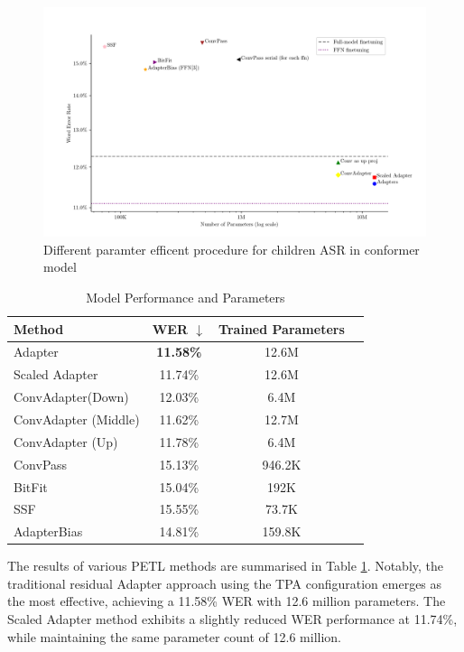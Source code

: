 \begin{figure}
    \begin{center}
        \includegraphics[width=\textwidth]{imgs/Adapter_compare_withoutWide.png}
        \caption{Different paramter efficent procedure for children ASR in conformer model}
        \label{fig:adapter_compared_withoutWide}
    \end{center}
\end{figure}
\begin{table}
    \centering
    \begin{tabular}{lccc}
        \toprule
        \textbf{Method} & \textbf{WER $\downarrow$} & \textbf{Trained Parameters} \\
        \midrule
        Adapter & \textbf{11.58\%} & 12.6M \\
        Scaled Adapter & 11.74\% & 12.6M \\
        ConvAdapter(Down) & 12.03\% & 6.4M \\
        ConvAdapter (Middle) & 11.62\% & 12.7M \\
        ConvAdapter (Up) & 11.78\% & 6.4M \\
        ConvPass & 15.13\% & 946.2K \\
        BitFit & 15.04\% & 192K \\
        SSF & 15.55\% & 73.7K \\
        AdapterBias & 14.81\% & 159.8K \\
        \bottomrule
    \end{tabular}
    \caption{Model Performance and Parameters}
    \label{tab:PETL_alternatives}
\end{table}
The results of various PETL methods are summarised in Table \ref{tab:PETL_alternatives}. Notably, the traditional residual Adapter approach using the TPA configuration emerges as the most effective, achieving a 11.58\% WER with 12.6 million parameters. The Scaled Adapter method exhibits a slightly reduced WER performance at 11.74\%, while maintaining the same parameter count of 12.6 million.

